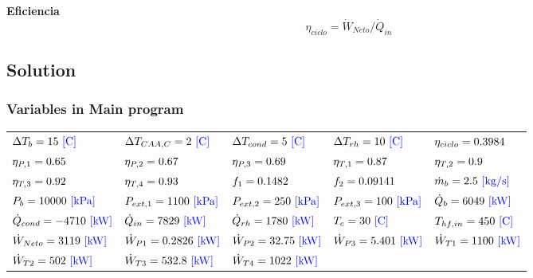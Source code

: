 \documentclass[10pt,fleqn]{article}
\theoremstyle{mytheoremstyle}
\theoremstyle{mytheoremstyle}
\theoremstyle{myproblemstyle}
\begin{document}
\vspace{0.10in}
\noindent
{\color{red} \bf Eficiencia}
\begin{equation}
\label{EES Eqn:87}
\eta_{ciclo}= \dot {W}_{Neto}/\dot {Q}_{in} 
\end{equation} 
\subsection*{Solution}
\subsubsection*{Variables in Main program}
\vspace{-0.18 in}
\setlength\LTleft{0pt}
\setlength\LTright{0pt}
\begin{longtable}{lllll}
${\Delta T_{b} =15 \rm\ {\color{blue} \left[C\right]}}$ & 
${\Delta T_{CAA,C} =2 \rm\ {\color{blue} \left[C\right]}}$ & 
${\Delta T_{cond} =5 \rm\ {\color{blue} \left[C\right]}}$ & 
${\Delta T_{rh} =10 \rm\ {\color{blue} \left[C\right]}}$ & 
${\eta_{ciclo} =0.3984 \rm}$ \\
${\eta_{P,1} =0.65 \rm}$ & 
${\eta_{P,2} =0.67 \rm}$ & 
${\eta_{P,3} =0.69 \rm}$ & 
${\eta_{T,1} =0.87 \rm}$ & 
${\eta_{T,2} =0.9 \rm}$ \\
${\eta_{T,3} =0.92 \rm}$ & 
${\eta_{T,4} =0.93 \rm}$ & 
${f_{1} =0.1482 \rm}$ & 
${f_{2} =0.09141 \rm}$ & 
${\dot{m}_{b} =2.5 \rm\ {\color{blue} \left[kg/s\right]}}$ \\
${P_{b} =10000 \rm\ {\color{blue} \left[kPa\right]}}$ & 
${P_{ext,1} =1100 \rm\ {\color{blue} \left[kPa\right]}}$ & 
${P_{ext,2} =250 \rm\ {\color{blue} \left[kPa\right]}}$ & 
${P_{ext,3} =100 \rm\ {\color{blue} \left[kPa\right]}}$ & 
${\dot{Q}_{b} =6049 \rm\ {\color{blue} \left[kW\right]}}$ \\
${\dot{Q}_{cond} =-4710 \rm\ {\color{blue} \left[kW\right]}}$ & 
${\dot{Q}_{in} =7829 \rm\ {\color{blue} \left[kW\right]}}$ & 
${\dot{Q}_{rh} =1780 \rm\ {\color{blue} \left[kW\right]}}$ & 
${T_{c} =30 \rm\ {\color{blue} \left[C\right]}}$ & 
${T_{hf,in} =450 \rm\ {\color{blue} \left[C\right]}}$ \\
${\dot{W}_{Neto} =3119 \rm\ {\color{blue} \left[kW\right]}}$ & 
${\dot{W}_{P1} =0.2826 \rm\ {\color{blue} \left[kW\right]}}$ & 
${\dot{W}_{P2} =32.75 \rm\ {\color{blue} \left[kW\right]}}$ & 
${\dot{W}_{P3} =5.401 \rm\ {\color{blue} \left[kW\right]}}$ & 
${\dot{W}_{T1} =1100 \rm\ {\color{blue} \left[kW\right]}}$ \\
${\dot{W}_{T2} =502 \rm\ {\color{blue} \left[kW\right]}}$ & 
${\dot{W}_{T3} =532.8 \rm\ {\color{blue} \left[kW\right]}}$ & 
${\dot{W}_{T4} =1022 \rm\ {\color{blue} \left[kW\right]}}$\end{longtable}
\end{document}
